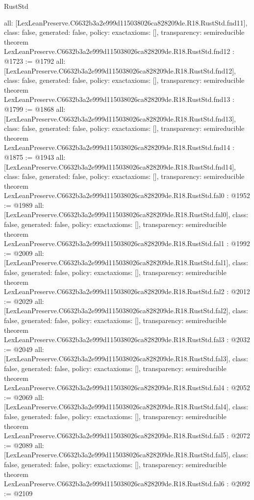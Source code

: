 \begin{lexlean}{RustStd}
\begin{coremodule}
{  all: [LexLeanPreserve.C6632b3a2e999d115038026ca828209de.R18.RustStd.fnd11],
  class: false,
  generated: false,
  policy: exact{axioms: []},
  transparency: semireducible
}
theorem LexLeanPreserve.C6632b3a2e999d115038026ca828209de.R18.RustStd.fnd12 : @1723 := @1792 {
  all: [LexLeanPreserve.C6632b3a2e999d115038026ca828209de.R18.RustStd.fnd12],
  class: false,
  generated: false,
  policy: exact{axioms: []},
  transparency: semireducible
}
theorem LexLeanPreserve.C6632b3a2e999d115038026ca828209de.R18.RustStd.fnd13 : @1799 := @1868 {
  all: [LexLeanPreserve.C6632b3a2e999d115038026ca828209de.R18.RustStd.fnd13],
  class: false,
  generated: false,
  policy: exact{axioms: []},
  transparency: semireducible
}
theorem LexLeanPreserve.C6632b3a2e999d115038026ca828209de.R18.RustStd.fnd14 : @1875 := @1943 {
  all: [LexLeanPreserve.C6632b3a2e999d115038026ca828209de.R18.RustStd.fnd14],
  class: false,
  generated: false,
  policy: exact{axioms: []},
  transparency: semireducible
}
theorem LexLeanPreserve.C6632b3a2e999d115038026ca828209de.R18.RustStd.fal0 : @1952 := @1989 {
  all: [LexLeanPreserve.C6632b3a2e999d115038026ca828209de.R18.RustStd.fal0],
  class: false,
  generated: false,
  policy: exact{axioms: []},
  transparency: semireducible
}
theorem LexLeanPreserve.C6632b3a2e999d115038026ca828209de.R18.RustStd.fal1 : @1992 := @2009 {
  all: [LexLeanPreserve.C6632b3a2e999d115038026ca828209de.R18.RustStd.fal1],
  class: false,
  generated: false,
  policy: exact{axioms: []},
  transparency: semireducible
}
theorem LexLeanPreserve.C6632b3a2e999d115038026ca828209de.R18.RustStd.fal2 : @2012 := @2029 {
  all: [LexLeanPreserve.C6632b3a2e999d115038026ca828209de.R18.RustStd.fal2],
  class: false,
  generated: false,
  policy: exact{axioms: []},
  transparency: semireducible
}
theorem LexLeanPreserve.C6632b3a2e999d115038026ca828209de.R18.RustStd.fal3 : @2032 := @2049 {
  all: [LexLeanPreserve.C6632b3a2e999d115038026ca828209de.R18.RustStd.fal3],
  class: false,
  generated: false,
  policy: exact{axioms: []},
  transparency: semireducible
}
theorem LexLeanPreserve.C6632b3a2e999d115038026ca828209de.R18.RustStd.fal4 : @2052 := @2069 {
  all: [LexLeanPreserve.C6632b3a2e999d115038026ca828209de.R18.RustStd.fal4],
  class: false,
  generated: false,
  policy: exact{axioms: []},
  transparency: semireducible
}
theorem LexLeanPreserve.C6632b3a2e999d115038026ca828209de.R18.RustStd.fal5 : @2072 := @2089 {
  all: [LexLeanPreserve.C6632b3a2e999d115038026ca828209de.R18.RustStd.fal5],
  class: false,
  generated: false,
  policy: exact{axioms: []},
  transparency: semireducible
}
theorem LexLeanPreserve.C6632b3a2e999d115038026ca828209de.R18.RustStd.fal6 : @2092 := @2109 {
}
\end{coremodule}
\end{lexlean}
